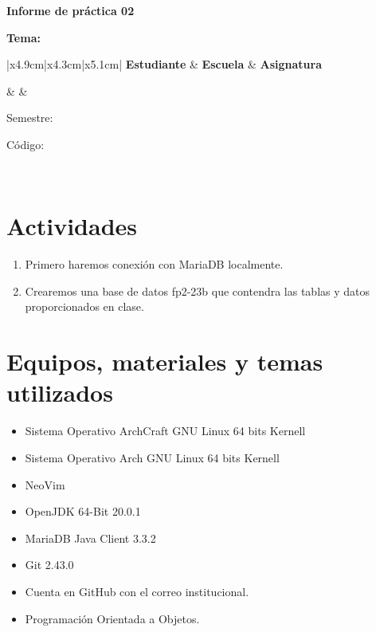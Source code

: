 
	
	\vspace*{10pt}
	
	\begin{center}	
		\fontsize{17}{17} \textbf{ Informe de práctica 02\itemPracticeNumber}
	\end{center}
	\centerline{\textbf{\Large Tema: \itemTheme}}
	\vspace*{0.5cm}	

	\begin{table}[H]
		\begin{tabular}{|x{4.9cm}|x{4.3cm}|x{5.1cm}|}
			\hline 
			\color{white} \textbf{Estudiante} & \color{white}\textbf{Escuela}  & \color{white}\textbf{Asignatura}   \\
			\hline 
			{\itemStudent \par \itemEmail} & \itemSchool & {\itemCourse \par Semestre: \itemSemester \par Código: \itemCourseCode}     \\
			\hline 			
		\end{tabular}
	\end{table}		
	
	\section{Actividades}
\begin{enumerate}
    \item Primero haremos conexión con MariaDB localmente.
    \item Crearemos una base de datos fp2-23b que contendra las tablas y datos proporcionados en clase.
\end{enumerate}
		
	\section{Equipos, materiales y temas utilizados}
	\begin{itemize}
		\item Sistema Operativo ArchCraft GNU Linux 64 bits Kernell
		\item Sistema Operativo Arch GNU Linux 64 bits Kernell
		\item NeoVim
		\item OpenJDK 64-Bit 20.0.1 
		\item MariaDB Java Client 3.3.2
		\item Git 2.43.0
		\item Cuenta en GitHub con el correo institucional.
		\item Programación Orientada a Objetos.
	\end{itemize}
